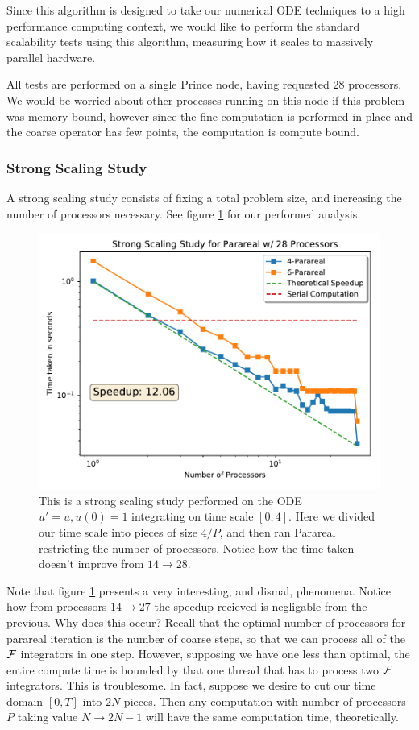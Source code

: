 Since this algorithm is designed to take our numerical ODE techniques to a high
performance computing context, we would like to perform the standard scalability
tests using this algorithm, measuring how it scales to massively parallel
hardware.

All tests are performed on a single Prince node, having requested 28 processors.
We would be worried about other processes running on this node if this problem
was memory bound, however since the fine computation is performed in place and
the coarse operator has few points, the computation is compute bound.

\subsubsection{Strong Scaling Study}

A strong scaling study consists of fixing a total problem size, and increasing
the number of processors necessary. See figure \ref{fig:strong_scaling} for our
performed analysis.
\begin{figure}[!htb]
  \centering
  \includegraphics[width=.8\textwidth]{./resources/strong_scaling}
  \caption{This is a strong scaling study performed on the ODE $u' = u, u(0) =
  1$ integrating on time scale $[0, 4]$. Here we divided our time scale into
  pieces of size $4/P$, and then ran Parareal restricting the number of
  processors. Notice how the time taken doesn't improve from $14 \to
  28$.}\label{fig:strong_scaling}
\end{figure}
Note that figure \ref{fig:strong_scaling} presents a very interesting, and
dismal, phenomena. Notice how from processors $14 \to 27$ the speedup recieved
is negligable from the previous. Why does this occur? Recall that the optimal
number of processors for parareal iteration is the number of coarse steps, so
that we can process all of the $\mathcal{F}$ integrators in one step. However,
supposing we have one less than optimal, the entire compute time is bounded by
that one thread that has to process two $\mathcal{F}$ integrators. This is
troublesome.
In fact, suppose we desire to cut our time domain $[0, T]$ into $2N$ pieces.
Then any computation with number of processors $P$ taking value $N \to 2N-1$
will have the same computation time, theoretically.

